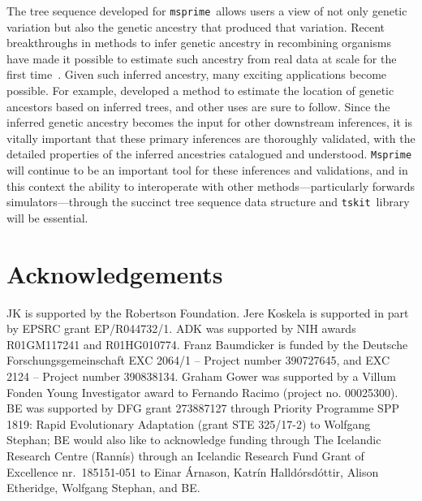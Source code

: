 \documentclass{article}
\newcommand{\msprime}[0]{\texttt{msprime}}
\newcommand{\tskit}[0]{\texttt{tskit}}
\begin{document}
The tree sequence developed for \msprime\ allows users a view of not only
genetic variation but also the genetic ancestry that produced that variation.
Recent breakthroughs in methods to infer genetic ancestry in recombining
organisms~\citep{kelleher2019inferring,
speidel2019method,wohns2021unified,schaefer2021ancestral,speidel2021inferring}
have made it possible to estimate such ancestry from real data at scale for
the first time~\citep{harris2019database,tang2019genealogy}.
Given such inferred ancestry, many exciting applications
become possible. For example, \cite{osmond2021estimating}
developed a method to estimate the location of genetic ancestors
based on inferred trees, and other uses are sure to follow.
Since the inferred genetic ancestry
becomes the input for other downstream inferences, it is vitally
important that these primary inferences are thoroughly validated,
with the detailed properties of the inferred ancestries
catalogued and understood.
\texttt{Msprime} will continue to be an important tool for these inferences and validations,
and in this context the ability to interoperate
with other methods---particularly forwards simulators---through
the succinct tree sequence data structure and \tskit\ library
will be essential.

\section*{Acknowledgements}
JK is supported by the Robertson Foundation.
Jere Koskela is supported in part by EPSRC grant EP/R044732/1.
ADK was supported by NIH awards R01GM117241 and R01HG010774.
Franz Baumdicker is funded by the Deutsche Forschungsgemeinschaft
EXC 2064/1 -- Project number 390727645, and EXC 2124 -- Project number 390838134.
Graham Gower was supported by a Villum Fonden Young Investigator award to Fernando Racimo (project no. 00025300).
BE was supported by  DFG grant  273887127 through Priority
Programme SPP 1819: Rapid Evolutionary Adaptation (grant STE 325/17-2) to Wolfgang Stephan; BE would also like to acknowledge  funding through The Icelandic Research
Centre (Rann{\'i}s) through an Icelandic Research Fund Grant of  Excellence nr.\ 185151-051 to Einar \'Arnason,  Katr\'in Halld\'orsd\'ottir,  Alison Etheridge,  Wolfgang Stephan, and BE. 





 \newcommand{\be}{\begin{equation}}
 \newcommand{\ee}{\end{equation}}
 \newcommand{\bd}{\begin{displaymath}}
 \newcommand{\ed}{\end{displaymath}}
\newcommand{\IN}{\ensuremath{\mathds{N}}}%
\newcommand{\EE}[1]{\ensuremath{\mathds{E}\left[ #1 \right]}}%
\newcommand{\one}[1]{\ensuremath{\mathds{1}_{\left\{ #1 \right\}}}}%
\newcommand{\prb}[1]{\ensuremath{\mathds{P}\left( #1 \right) } }%
\end{document}

